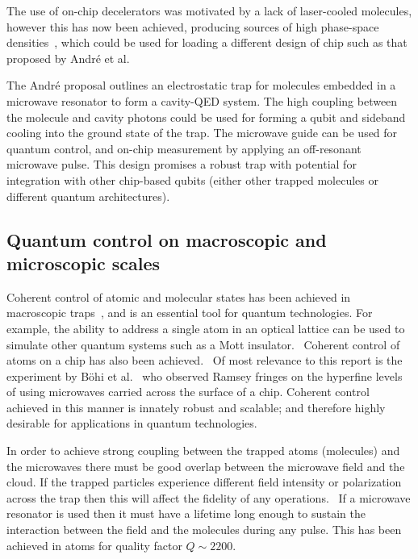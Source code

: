 The use of on-chip decelerators was motivated by a lack of laser-cooled
molecules, however this has now been achieved, producing sources of high
phase-space densities~\cite{Truppe2017}, which could be used for loading a
different design of chip such as that proposed by Andr\'e et
al.~\cite{Andre2006}

The Andr\'e proposal outlines an electrostatic trap for molecules embedded in a
microwave resonator to form a cavity-QED system. The high coupling between the
molecule and cavity photons could be used for forming a qubit and sideband
cooling into the ground state of the trap. The microwave guide can be used for
quantum control, and on-chip measurement by applying an off-resonant microwave
pulse. This design promises a robust trap with potential for integration with
other chip-based qubits (either other trapped molecules or different quantum
architectures).

\subsection{Quantum control on macroscopic and microscopic scales}
\label{litrev:control}


%
Coherent control of atomic and molecular states has been achieved in macroscopic
traps~\cite{Gross995, Blackmore_2018}, and is an essential tool for quantum
technologies. For example, the ability to address a single atom in an optical
lattice can be used to simulate other quantum systems such as a Mott
insulator.~\cite{Weitenberg2011} Coherent control of atoms on a chip has also
been achieved.~\cite{PhysRevLett.92.063601} Of most relevance to this report is
the experiment by B\"ohi et al.~\cite{Boehi2009} who observed Ramsey fringes on
the hyperfine levels of \esRb{} using microwaves carried across the surface of a
chip. Coherent control achieved in this manner is innately robust and scalable;
and therefore highly desirable for applications in quantum technologies.

%
In order to achieve strong coupling between the trapped atoms (molecules) and the
microwaves there must be good overlap between the microwave field and the cloud.
If the trapped particles experience different field intensity or polarization
across the trap then this will affect the fidelity of any
operations.~\cite{Williams2018} If a microwave resonator is used then it must
have a lifetime long enough to sustain the interaction between the field and the
molecules during any pulse. This has been achieved in atoms for quality factor
$Q\sim2200$.~\cite{Hattermann2017}


